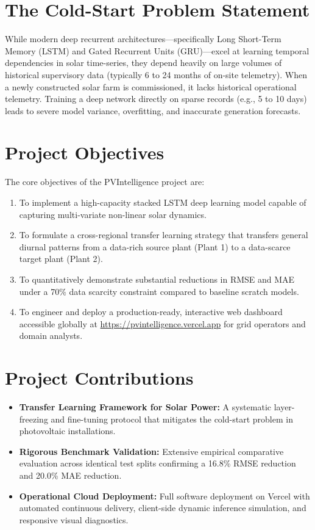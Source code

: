 \documentclass[12pt,a4paper,oneside]{report}
\begin{document}
\section{The Cold-Start Problem Statement}
While modern deep recurrent architectures—specifically Long Short-Term Memory (LSTM) and Gated Recurrent Units (GRU)—excel at learning temporal dependencies in solar time-series, they depend heavily on large volumes of historical supervisory data (typically 6 to 24 months of on-site telemetry). When a newly constructed solar farm is commissioned, it lacks historical operational telemetry. Training a deep network directly on sparse records (e.g., 5 to 10 days) leads to severe model variance, overfitting, and inaccurate generation forecasts.

\section{Project Objectives}
The core objectives of the PVIntelligence project are:
\begin{enumerate}
    \item To implement a high-capacity stacked LSTM deep learning model capable of capturing multi-variate non-linear solar dynamics.
    \item To formulate a cross-regional transfer learning strategy that transfers general diurnal patterns from a data-rich source plant (Plant 1) to a data-scarce target plant (Plant 2).
    \item To quantitatively demonstrate substantial reductions in RMSE and MAE under a 70\% data scarcity constraint compared to baseline scratch models.
    \item To engineer and deploy a production-ready, interactive web dashboard accessible globally at \url{https://pvintelligence.vercel.app} for grid operators and domain analysts.
\end{enumerate}

\section{Project Contributions}
\begin{itemize}
    \item \textbf{Transfer Learning Framework for Solar Power:} A systematic layer-freezing and fine-tuning protocol that mitigates the cold-start problem in photovoltaic installations.
    \item \textbf{Rigorous Benchmark Validation:} Extensive empirical comparative evaluation across identical test splits confirming a 16.8\% RMSE reduction and 20.0\% MAE reduction.
    \item \textbf{Operational Cloud Deployment:} Full software deployment on Vercel with automated continuous delivery, client-side dynamic inference simulation, and responsive visual diagnostics.
\end{itemize}
\end{document}

